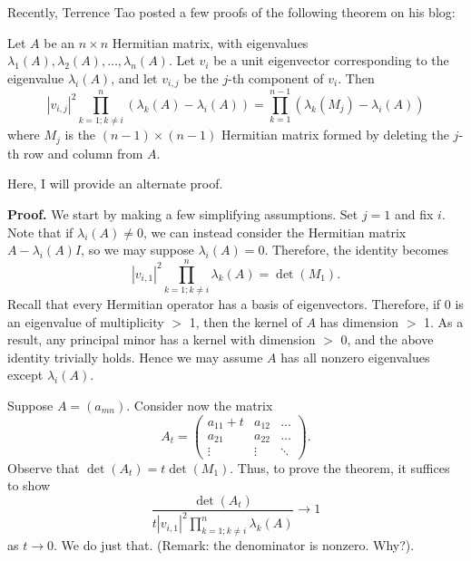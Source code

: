 \documentclass[12pt, a4paper]{article}
\renewcommand{\l}{\lambda}
\begin{document}
Recently, Terrence Tao posted a few proofs of the following theorem on his blog:
\begin{tcolorbox}[colback=blue!5!white,colframe=blue!75!black]
    Let $A$ be an $n \times n$ Hermitian matrix, with eigenvalues $\l_1(A), \l_2(A), \dots, \l_n(A)$. Let $v_i$ be a unit eigenvector corresponding to the eigenvalue $\l_i(A)$, and let $v_{i,j}$ be the $j$-th component of $v_i$. Then
    \[
        |v_{i,j}|^2 \prod_{k = 1; k \neq i}^n (\l_k(A) - \l_i(A))
        = \prod_{k = 1}^{n-1}(\l_k(M_j) - \l_i(A))
    \]
    where $M_j$ is the $(n-1) \times (n-1)$ Hermitian matrix formed by deleting the $j$-th row and column from $A$.
\end{tcolorbox}
Here, I will provide an alternate proof.

\textbf{Proof.} We start by making a few simplifying assumptions. Set $j = 1$ and fix $i$. Note that if $\l_i(A) \neq 0$, we can instead consider the Hermitian matrix $A - \l_i(A)I$, so we may suppose $\l_i(A) = 0$. Therefore, the identity becomes
\[
    |v_{i,1}|^2 \prod_{k = 1; k \neq i}^n \l_k(A)
    = \det(M_1). 
\]
Recall that every Hermitian operator has a basis of eigenvectors. Therefore, if 0 is an eigenvalue of multiplicity $>$ 1, then the kernel of $A$ has dimension $>$ 1. As a result, any principal minor has a kernel with dimension $>$ 0, and the above identity trivially holds. Hence we may assume $A$ has all nonzero eigenvalues except $\l_i(A)$.

Suppose $A = (a_{mn})$. Consider now the matrix
\[
    A_t = 
    \begin{pmatrix}
        a_{11} + t  & a_{12}    & \dots\\
        a_{21}      & a_{22}    & \dots\\
        \vdots      & \vdots    & \ddots
    \end{pmatrix}.
\]
Observe that $\det(A_t) = t\det(M_1)$. Thus, to prove the theorem, it suffices to show
\[
    \frac{\det(A_t)}{
    t|v_{i,1}|^2 \prod_{k = 1; k \neq i}^n \l_k(A)
    } \rightarrow 1
\]
as $t \rightarrow 0$. We do just that. (Remark: the denominator is nonzero. Why?).
\end{document}
